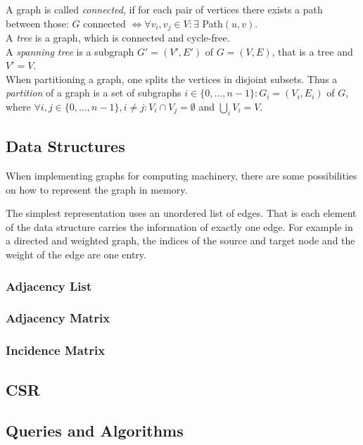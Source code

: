            A graph is called \textit{connected}, if for each pair of vertices there exists a path between those: $G$ connected $\Leftrightarrow \forall v_i, v_j \in V: \exists$ Path$(u, v)$.  \\
            A \textit{tree} is a graph, which is connected and cycle-free. \\
            A \textit{spanning tree} is a subgraph $G' = (V', E')$ of $G = (V, E)$, that is a tree and $V' = V$. \\
            
            When partitioning a graph, one splits the vertices in disjoint subsets. Thus a \textit{partition} of a graph is a set of subgraphs $i\in \{0, \dots, n-1\}: G_i = (V_i, E_i)$ of $G$, where $\forall i,j \in \{0, \dots, n-1\}, i \neq j: V_i \cap V_j = \emptyset$ and $\bigcup_i V_i = V$.
            
    \subsection{Data Structures}\label{\positionnumber}
        When implementing graphs for computing machinery, there are some possibilities on how to represent the graph in memory. 
        
        The simplest representation uses an unordered list of edges. That is each element of the data structure carries the information of exactly one edge. For example in a directed and weighted graph, the indices of the source and target node and the weight of the edge are one entry. \\
        \subsubsection{Adjacency List}
        \subsubsection{Adjacency Matrix}
        \subsubsection{Incidence Matrix}
        \subsection{CSR}

    \subsection{Queries and Algorithms}\label{\positionnumber}
